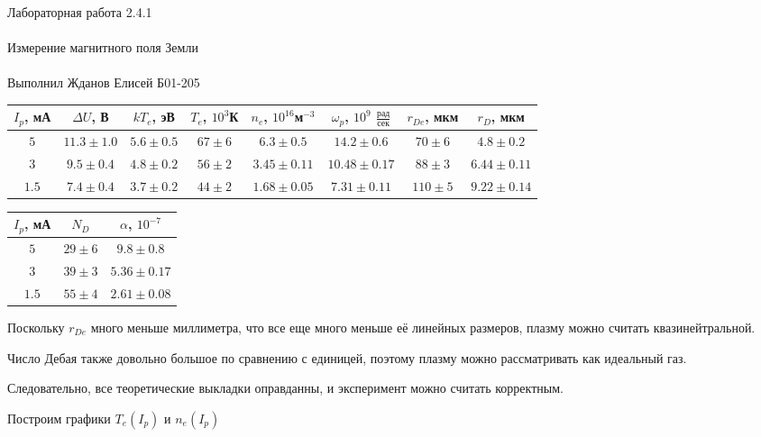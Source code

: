 \documentclass{astroedu-lab}
\begin{document}
\begin{problem}{\huge Лабораторная работа 2.4.1\\\\Измерение магнитного поля Земли\\\\Выполнил Жданов Елисей Б01-205}
\begin{center}
\begin{tabular}{|c|c|c|c|c|c|c|c|}
\hline 
$I_p$, мА & $\Delta U$, В & $kT_e$, эВ & $T_e$, $10^3$К & $n_e$, $10^{16}$м$^{-3}$ & $\omega_p$, $10^{9}$ $\frac{\text{рад}}{\text{сек}}$ & $r_{De}$, мкм & $r_D$, мкм \\
\hline
$5$ 	& $11.3 \pm 1.0$ 	& $5.6 \pm 0.5$ & $67 \pm 6$ & 
$6.3 \pm 0.5$ & $14.2 \pm 0.6$		& $70 \pm 6$ & 
$4.8 \pm 0.2$ \\
$3$ 	& $9.5 \pm 0.4$ 	& $4.8 \pm 0.2$ & $56 \pm 2$ & 
$3.45 \pm 0.11$ & $10.48 \pm 0.17$	& $88 \pm 3$ & 
$6.44 \pm 0.11$ \\
$1.5$ 	& $7.4 \pm 0.4$ 	& $3.7 \pm 0.2$ & $44 \pm 2$ & 
$1.68 \pm 0.05$ & $7.31 \pm 0.11$	& $110 \pm 5$ & 
$9.22 \pm 0.14$ \\
\hline
\end{tabular}
\end{center}

\begin{center}
\begin{tabular}{|c|c|c|}
\hline 
$I_p$, мА & $N_D$ & $\alpha$, $10^{-7}$ \\
\hline
$5$ 	& $29 \pm 6$ & $9.8 \pm 0.8$ \\
$3$ 	& $39 \pm 3$ & $5.36 \pm 0.17$ \\
$1.5$ 	& $55 \pm 4$ & $2.61 \pm 0.08$ \\
\hline
\end{tabular}
\end{center}

Поскольку $r_{De}$ много меньше миллиметра, что все еще много меньше её линейных размеров, плазму можно считать квазинейтральной.

Число Дебая также довольно большое по сравнению с единицей, поэтому плазму можно рассматривать как идеальный газ.

Следовательно, все теоретические выкладки оправданны, и эксперимент можно считать корректным.

Построим графики $T_e\left(I_p\right)$ и $n_e\left(I_p\right)$

\newpage


\end{problem}
\end{document}
